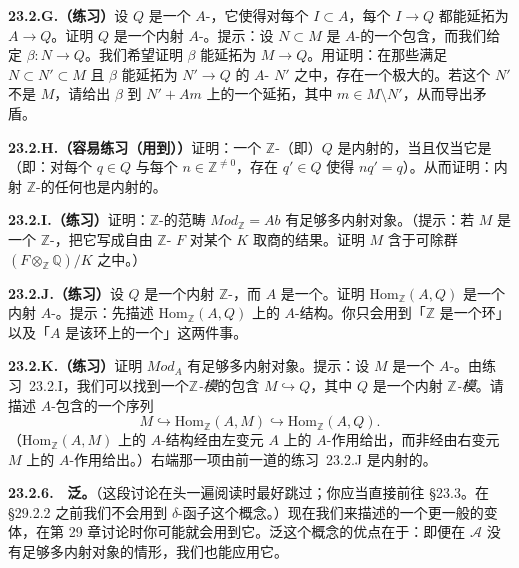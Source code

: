 \textbf{23.2.G.（练习）}\quad 设 $Q$ 是一个 $A$-\trModule，它使得对每个\trIdeal{} $I\subset A$，每个\trHomomorphism{} $I\to Q$ 都能延拓为 $A\to Q$。证明 $Q$ 是一个内射 $A$-\trModule。提示：设 $N\subset M$ 是 $A$-\trModule{}的一个包含，而我们给定 $\beta\colon N\to Q$。我们希望证明 $\beta$ 能延拓为 $M\to Q$。用\trZornsLemma 证明：在那些满足 $N\subset N'\subset M$ 且 $\beta$ 能延拓为 $N'\to Q$ 的 $A$-\trModule{} $N'$ 之中，存在一个极大的。若这个 $N'$ 不是 $M$，请给出 $\beta$ 到 $N'+Am$ 上的一个延拓，其中 $m\in M\setminus N'$，从而导出矛盾。

\textbf{23.2.H.（容易练习（用到\trZornsLemma））}\quad 证明：一个 $\mathbb{Z}$-\trModule（即\trAbelianGroups）$Q$ 是内射的，当且仅当它是\trDivisibleGroup（即：对每个 $q\in Q$ 与每个 $n\in\mathbb{Z}^{\neq 0}$，存在 $q'\in Q$ 使得 $nq'=q$）。从而证明：内射 $\mathbb{Z}$-\trModule{}的任何\trQuotient{}也是内射的。

\textbf{23.2.I.（练习）}\quad 证明：$\mathbb{Z}$-\trModule{}的范畴 $\mathit{Mod}_{\mathbb{Z}}=\mathit{Ab}$ 有足够多内射对象。（提示：若 $M$ 是一个 $\mathbb{Z}$-\trModule，把它写成自由 $\mathbb{Z}$-\trModule{} $F$ 对某个 $K$ 取商的结果。证明 $M$ 含于可除群 $(F\otimes_{\mathbb{Z}}\mathbb{Q})/K$ 之中。）

\textbf{23.2.J.（练习）}\quad 设 $Q$ 是一个内射 $\mathbb{Z}$-\trModule，而 $A$ 是一个\trRing。证明 $\mathrm{Hom}_{\mathbb{Z}}(A,Q)$ 是一个内射 $A$-\trModule。提示：先描述 $\mathrm{Hom}_{\mathbb{Z}}(A,Q)$ 上的 $A$-\trModule{}结构。你只会用到「$\mathbb{Z}$ 是一个环」以及「$A$ 是该环上的一个\trAlgebra」这两件事。

\textbf{23.2.K.（练习）}\quad 证明 $\mathit{Mod}_A$ 有足够多内射对象。提示：设 $M$ 是一个 $A$-\trModule。由\mbox{练习~23.2.I}，我们可以找到一个\emph{$\mathbb{Z}$-模}的包含 $M\hookrightarrow Q$，其中 $Q$ 是一个内射 \emph{$\mathbb{Z}$-模}。请描述 $A$-\trModule{}包含的一个序列
\[
M \hookrightarrow \mathrm{Hom}_{\mathbb{Z}}(A,M) \hookrightarrow \mathrm{Hom}_{\mathbb{Z}}(A,Q).
\]
（$\mathrm{Hom}_{\mathbb{Z}}(A,M)$ 上的 $A$-\trModule{}结构经由左变元 $A$ 上的 $A$-作用给出，而非经由右变元 $M$ 上的 $A$-作用给出。）右端那一项由前一道的\mbox{练习~23.2.J} 是内射的。

\textbf{23.2.6.}\ \hard\ \textbf{泛\trDeltaFunctor。}\quad （这段讨论在头一遍阅读时最好跳过；你应当直接前往 \S23.3。在 \S29.2.2 之前我们不会用到 $\delta$-函子这个概念。）现在我们来描述\trDerivedFunctor{}的一个更一般的变体，在第 29 章讨论\trSerreDuality{}时你可能就会用到它。泛\trDeltaFunctor{}这个概念的优点在于：即便在 $\mathscr{A}$ 没有足够多内射对象的情形，我们也能应用它。

